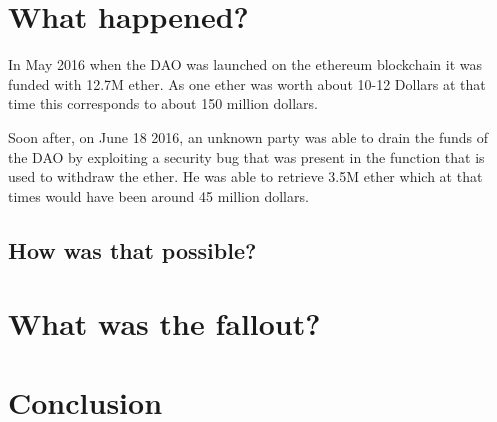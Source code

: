 \documentclass[a4paper, 11pt]{scrartcl}
\begin{document}
\section{What happened?}

In May 2016 when the DAO was launched on the ethereum blockchain it was funded with 12.7M ether. As one ether was worth about 10-12 Dollars at that time this corresponds to about 150 million dollars. 

Soon after, on June 18 2016, an unknown party was able to drain the funds of the DAO by exploiting a security bug that was present in the function that is used to withdraw the ether. He was able to retrieve 3.5M ether which at that times would have been around 45 million dollars. 

\subsection{How was that possible?}



\section{What was the fallout?}

\section{Conclusion}

\nocite{*}
\clearpage
\printbibliography[heading=bibintoc]
\end{document}
